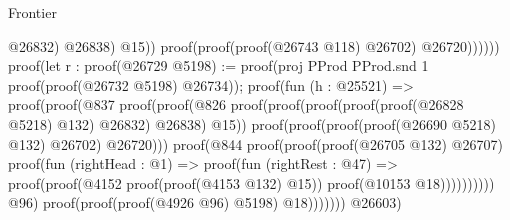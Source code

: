 \begin{lexlean}{Frontier}
\begin{coremodule}
                                                                      @26832)
                                                                    @26838)
                                                                  @15))
                                                            proof(proof(proof(@26743 @118) @26702)
                                                                @26720))))))
                                                proof(let r : proof(@26729
                                                      @5198) := proof(proj PProd PProd.snd 1
                                                    proof(proof(@26732 @5198) @26734));
                                                  proof(fun (h : @25521) =>
                                                    proof(proof(@837
                                                          proof(proof(@826
                                                                proof(proof(proof(proof(proof(@26828
                                                                            @5218)
                                                                          @132)
                                                                        @26832)
                                                                      @26838)
                                                                    @15))
                                                              proof(proof(proof(proof(@26690 @5218)
                                                                      @132)
                                                                    @26702)
                                                                  @26720)))
                                                        proof(@844
                                                            proof(proof(proof(@26705 @132) @26707)
                                                                proof(fun (rightHead : @1) =>
                                                                  proof(fun (rightRest : @47) =>
                                                                    proof(proof(@4152
                                                                          proof(proof(@4153 @132)
                                                                              @15))
                                                                        proof(@10153 @18))))))))))
                                              @96)
                                            proof(proof(proof(@4926 @96) @5198) @18)))))))
                              @26603)

\end{coremodule}
\end{lexlean}
